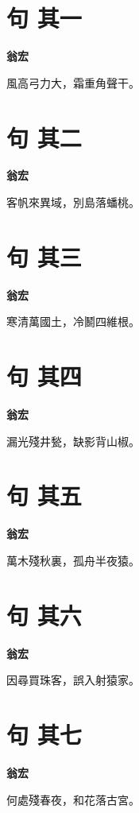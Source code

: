 \documentclass[12pt,a4paper]{ctexbook}
\begin{document}
\section{句  其一}
\textbf{翁宏}\par\vspace{0.5em}
風高弓力大，霜重角聲干。\par

\section{句  其二}
\textbf{翁宏}\par\vspace{0.5em}
客帆來異域，別島落蟠桃。\par

\section{句  其三}
\textbf{翁宏}\par\vspace{0.5em}
寒清萬國土，冷鬭四維根。\par

\section{句  其四}
\textbf{翁宏}\par\vspace{0.5em}
漏光殘井甃，缺影背山椒。\par

\section{句  其五}
\textbf{翁宏}\par\vspace{0.5em}
萬木殘秋裏，孤舟半夜猿。\par

\section{句  其六}
\textbf{翁宏}\par\vspace{0.5em}
因尋買珠客，誤入射猿家。\par

\section{句  其七}
\textbf{翁宏}\par\vspace{0.5em}
何處殘春夜，和花落古宮。\par
\end{document}
